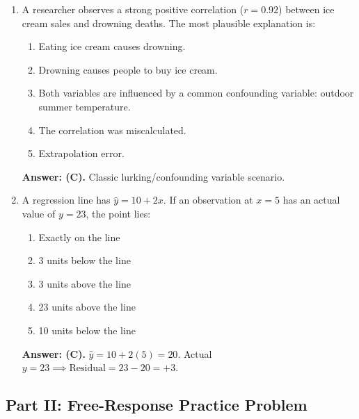 \begin{enumerate}[resume, leftmargin=1.5em]
  \item A researcher observes a strong positive correlation ($r = 0.92$) between ice cream sales and drowning deaths. The most plausible explanation is:
  \begin{enumerate}[label=(\Alph*)]
    \item Eating ice cream causes drowning.
    \item Drowning causes people to buy ice cream.
    \item Both variables are influenced by a common confounding variable: outdoor summer temperature.
    \item The correlation was miscalculated.
    \item Extrapolation error.
  \end{enumerate}
  \textbf{Answer: (C).} Classic lurking/confounding variable scenario.

  \item A regression line has $\hat{y} = 10 + 2x$. If an observation at $x = 5$ has an actual value of $y = 23$, the point lies:
  \begin{enumerate}[label=(\Alph*)]
    \item Exactly on the line \item 3 units below the line \item 3 units above the line \item 23 units above the line \item 10 units below the line
  \end{enumerate}
  \textbf{Answer: (C).} $\hat{y} = 10 + 2(5) = 20$. Actual $y = 23 \implies \text{Residual} = 23 - 20 = +3$.
\end{enumerate}

\subsection*{Part II: Free-Response Practice Problem}

